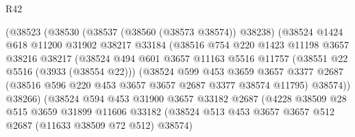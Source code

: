 \begin{lexlean}{R42}
\begin{coremodule}
                          (@38523
                            (@38530
                              (@38537 (@38560 (@38573 @38574)) @38238)
                              (@38524
                                @1424
                                @618
                                @11200
                                @31902
                                @38217
                                @33184
                                (@38516
                                  @754
                                  @220
                                  @1423
                                  @11198
                                  @3657
                                  @38216
                                  @38217
                                  (@38524
                                    @494
                                    @601
                                    @3657
                                    @11163
                                    @5516
                                    @11757
                                    (@38551 @22 @5516 (@3933 (@38554 @22)))
                                    (@38524
                                      @599
                                      @453
                                      @3659
                                      @3657
                                      @3377
                                      @2687
                                      (@38516 @596 @220 @453 @3657 @3657 @2687 @3377 @38574 @11795)
                                      @38574))
                                  @38266)
                                (@38524
                                  @594
                                  @453
                                  @31900
                                  @3657
                                  @33182
                                  @2687
                                  (@4228
                                    @38509
                                    @28
                                    @515
                                    @3659
                                    @31899
                                    @11606
                                    @33182
                                    (@38524
                                      @513
                                      @453
                                      @3657
                                      @3657
                                      @512
                                      @2687
                                      (@11633 @38509 @72 @512)
                                      @38574)

\end{coremodule}
\end{lexlean}
